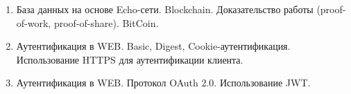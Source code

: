 \begin{enumerate}
    \item База данных на основе Echo-сети. Blockchain. Доказательство работы (proof-of-work, proof-of-share). BitCoin.
    \item Аутентификация в WEB. Basic, Digest, Cookie-аутентификация. Использование HTTPS для аутентификации клиента.
    \item Аутентификация в WEB. Протокол OAuth 2.0. Использование JWT.

\end{enumerate}
